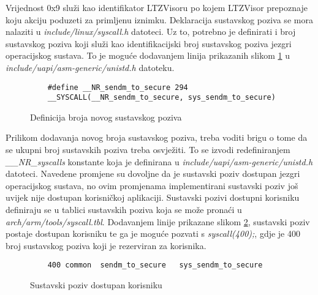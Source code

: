 \documentclass[times, utf8, diplomski, numeric]{fer}
\begin{document}
Vrijednost 0x9 služi kao identifikator LTZVisoru po kojem LTZVisor prepoznaje koju akciju poduzeti za primljenu iznimku.
Deklaracija sustavskog poziva se mora nalaziti u \textit{include/linux/syscall.h} datoteci. Uz to, potrebno je definirati
i broj sustavskog poziva koji služi kao identifikacijski broj sustavskog poziva jezgri operacijskog sustava. To je moguće
dodavanjem linija prikazanih slikom \ref{sc_num} u \textit{include/uapi/asm-generic/unistd.h} datoteku.

\begin{figure}[H]
  \begin{lstlisting}
    #define __NR_sendm_to_secure 294
    __SYSCALL(__NR_sendm_to_secure, sys_sendm_to_secure)
  \end{lstlisting}
  \caption{Definicija broja novog sustavskog poziva}
  \label{sc_num}
\end{figure}

Prilikom dodavanja novog broja sustavskog poziva, treba voditi brigu o tome da se ukupni broj sustavskih poziva treba
osvježiti. To se izvodi redefiniranjem \textit{\_\_NR\_syscalls} konstante koja je definirana u
\textit{include/uapi/asm-generic/unistd.h} datoteci. Navedene promjene su dovoljne da je sustavski poziv dostupan jezgri
operacijskog sustava, no ovim promjenama implementirani sustavski poziv još uvijek nije dostupan korisničkoj aplikaciji.
Sustavski pozivi dostupni korisniku definiraju se u tablici sustavskih poziva koja se može pronaći u
\textit{arch/arm/tools/syscall.tbl}. Dodavanjem linije prikazane slikom \ref{user_sc}, sustavski poziv postaje dostupan
korisniku te ga je moguće pozvati s \textit{syscall(400);}, gdje je 400 broj sustavskog poziva koji je rezerviran za
korisnika.

\begin{figure}[H]
  \begin{lstlisting}
    400 common  sendm_to_secure   sys_sendm_to_secure
  \end{lstlisting}
  \caption{Sustavski poziv dostupan korisniku}
  \label{user_sc}
\end{figure}
\end{document}
